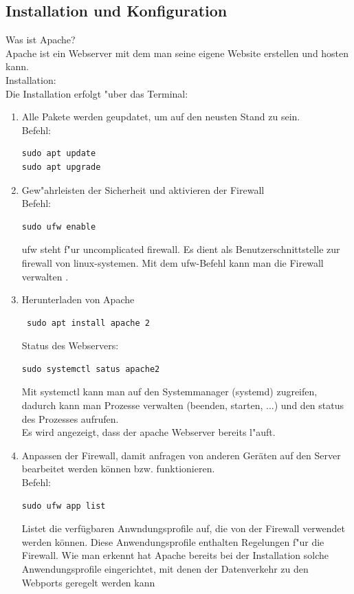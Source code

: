 \documentclass[a4paper,11pt,titlepage]{article}
\begin{document}
\subsection{Installation und Konfiguration}
Was ist Apache?\\
Apache ist ein Webserver mit dem man seine eigene Website erstellen und hosten kann. \\
Installation:\\
Die Installation erfolgt "uber das Terminal:
\begin{enumerate}
\item Alle Pakete werden geupdatet, um auf den neusten Stand zu sein.\\
Befehl:
\begin{verbatim}
sudo apt update
sudo apt upgrade
\end{verbatim}
\item Gew"ahrleisten der Sicherheit und aktivieren der Firewall\\
Befehl: 
\begin{verbatim}
sudo ufw enable
\end{verbatim}
ufw steht f"ur uncomplicated firewall. Es dient als Benutzerschnittstelle zur firewall von linux-systemen. Mit dem ufw-Befehl kann man die Firewall verwalten .
\item Herunterladen von Apache
\begin{verbatim} sudo apt install apache 2 \end{verbatim}
Status des Webservers:
\begin{verbatim}sudo systemctl satus apache2 \end{verbatim}
Mit systemctl kann man auf den Systemmanager (systemd) zugreifen, dadurch kann man Prozesse verwalten (beenden, starten, ...) und den status des Prozesses aufrufen. \\
Es wird angezeigt, dass der apache Webserver bereits l"auft. 
\item Anpassen der Firewall, damit anfragen von anderen Geräten auf den Server bearbeitet werden können bzw. funktionieren.\\
Befehl: 
\begin{verbatim}sudo ufw app list \end{verbatim}
Listet die verfügbaren Anwndungsprofile auf, die von der Firewall verwendet werden können. Diese Anwendungsprofile enthalten Regelungen f"ur die Firewall. 
Wie man erkennt hat Apache bereits bei der Installation solche Anwendungsprofile eingerichtet, mit denen der Datenverkehr zu den Webports geregelt werden kann 
\end{enumerate}
\end{document}
